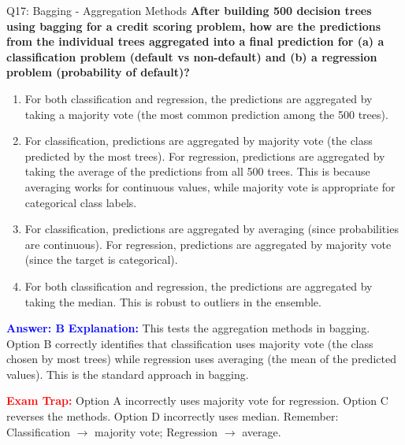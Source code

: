 \documentclass[8pt]{beamer}
\begin{document}
	\begin{frame}{Q17: Bagging - Aggregation Methods}
		\fontsize{6.5}{7.5}\selectfont
		\textbf{After building 500 decision trees using bagging for a credit scoring problem, how are the predictions from the individual trees aggregated into a final prediction for (a) a classification problem (default vs non-default) and (b) a regression problem (probability of default)?}
		
		\begin{enumerate}
			\item For both classification and regression, the predictions are aggregated by taking a majority vote (the most common prediction among the 500 trees).
			\item For classification, predictions are aggregated by majority vote (the class predicted by the most trees). For regression, predictions are aggregated by taking the average of the predictions from all 500 trees. This is because averaging works for continuous values, while majority vote is appropriate for categorical class labels.
			\item For classification, predictions are aggregated by averaging (since probabilities are continuous). For regression, predictions are aggregated by majority vote (since the target is categorical).
			\item For both classification and regression, the predictions are aggregated by taking the median. This is robust to outliers in the ensemble.
		\end{enumerate}
		
		\vspace{0.1cm}
		\textcolor{blue}{\textbf{Answer: B}}
		\vspace{0.1cm}
		\textcolor{blue}{\textbf{Explanation:}} This tests the aggregation methods in bagging. Option B correctly identifies that classification uses majority vote (the class chosen by most trees) while regression uses averaging (the mean of the predicted values). This is the standard approach in bagging.
		
		\textcolor{red}{\textbf{Exam Trap:}} Option A incorrectly uses majority vote for regression. Option C reverses the methods. Option D incorrectly uses median. Remember: Classification $\rightarrow$ majority vote; Regression $\rightarrow$ average.
	\end{frame}
	
\end{document}
